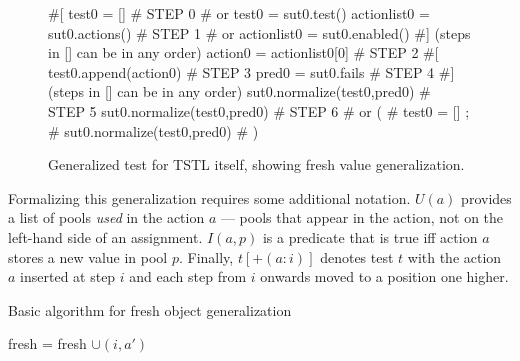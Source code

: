 \begin{figure}
{\scriptsize
\begin{code}
\textcolor{black!60}{\#[}
test0 = []                             \textcolor{black!60}{\# STEP 0}
\textcolor{black!60}{\#  or test0 = sut0.test() }
actionlist0 = sut0.actions()           \textcolor{black!60}{\# STEP 1}
\textcolor{black!60}{\#  or actionlist0 = sut0.enabled() }
\textcolor{black!60}{\#] (steps in [] can be in any order)}
action0 = actionlist0[0]               \textcolor{black!60}{\# STEP 2}
\textcolor{black!60}{\#[}
test0.append(action0)                  \textcolor{black!60}{\# STEP 3}
pred0 = sut0.fails                     \textcolor{black!60}{\# STEP 4}
\textcolor{black!60}{\#] (steps in [] can be in any order)}
sut0.normalize(test0,pred0)            \textcolor{black!60}{\# STEP 5}
sut0.normalize(test0,pred0)            \textcolor{black!60}{\# STEP 6}
\textcolor{black!60}{\#  or (}
\textcolor{black!60}{\#      test0 = []  ;}
\textcolor{black!60}{\#      sut0.normalize(test0,pred0) }
\textcolor{black!60}{\#     )}
\end{code}
}
\caption{Generalized test for TSTL itself, showing fresh value
  generalization.}
\label{fig:mislead}
\end{figure}

Formalizing this generalization requires some additional notation.
$U(a)$ provides a list of pools \emph{used} in the action $a$ --- pools that
appear in the action, not on the left-hand side of an assignment.
$I(a,p)$ is a predicate that is true iff action $a$ stores a new value
in pool $p$.  Finally, $t[+(a: i)]$ denotes test $t$ with the action
$a$ inserted at step $i$ and each step from $i$ onwards moved to a
position one higher.

\begin{algorithm}
\caption{Basic algorithm for fresh object generalization}
\label{freshalg}
\begin{algorithmic}[1]
\State fresh = fresh $\cup (i,a')$
\EndIf
\EndFor 
\EndFor
\EndFor
{}
\end{algorithmic}
\end{algorithm}

